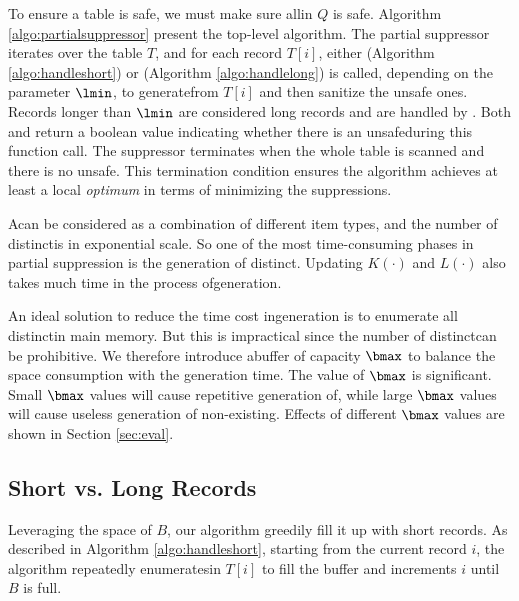 To ensure a table is safe,
we must make sure all\qids in $Q$ is safe.
Algorithm \ref{algo:partialsuppressor} present the top-level algorithm.
The partial suppressor iterates over the table $T$, and for each record $T[i]$,
either \HandleShortRecords (Algorithm \ref{algo:handleshort})
or \HandleLongRecord (Algorithm \ref{algo:handlelong}) is called,
depending on the parameter $\lmin$,
to generate\qids from $T[i]$ and then sanitize the unsafe ones.
Records longer than $\lmin$ are considered long records and are handled
by \HandleLongRecord.
Both \HandleShortRecords and \HandleLongRecord return a boolean value
indicating whether there is an unsafe\qid during this function call.
The suppressor terminates when the whole table is scanned and 
there is no unsafe\qidx. This termination condition ensures the algorithm
achieves at least a local {\em optimum} in terms of minimizing the 
suppressions.

A\qid can be considered as a combination of different item types,
  and the number of distinct\qids is in exponential scale.
So one of the most time-consuming phases in partial suppression is
  the generation of distinct\qidsx.
Updating $K(\cdot)$ and $L(\cdot)$ also takes much time
  in the process of\qid generation.

An ideal solution to reduce the time cost in\qid generation is
to enumerate all distinct\qids in main memory.
But this is impractical since the number of distinct\qids can be
prohibitive.
We therefore introduce a\qid buffer of capacity $\bmax$ to balance
the space consumption with the generation time.
The value of $\bmax$ is significant.
Small $\bmax$ values will cause repetitive generation of\qidsx,
while large $\bmax$ values will cause useless generation of
non-existing\qidsx. Effects of different $\bmax$ values are shown
in Section \ref{sec:eval}.

\subsection{Short vs. Long Records}
Leveraging the space of $B$, our algorithm greedily
fill it up with short records.
As described in Algorithm \ref{algo:handleshort},
starting from the current record $i$, the algorithm repeatedly
enumerates\qids in $T[i]$ to fill the buffer and increments $i$ until $B$ is full.

